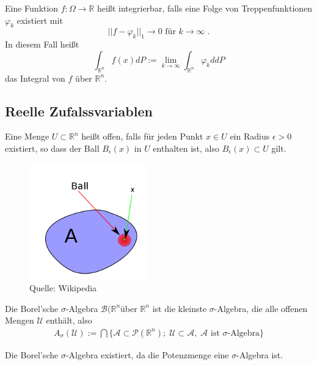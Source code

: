 \begin{Definition}
Eine Funktion $f : \Omega \to \mathbb{R}$ heißt integrierbar, falls eine Folge von Treppenfunktionen  $\varphi_k$ existiert mit
$$ || f -  \varphi_k ||_1 \to 0 \text{ für } k \to \infty \;. $$
In diesem Fall heißt
$$ \int_{\mathbb{R}^n} f(x) dP := \lim_{k \to \infty}  \int_{\mathbb{R}^n}  \varphi_k d dP$$
das Integral von $f$ über $\mathbb{R}^n$.
\end{Definition}


\subsection{Reelle Zufalssvariablen}

\begin{Definition}
Eine Menge $U \subset  \mathbb{R}^n$ heißt offen, falls für jeden Punkt $x \in U$ ein Radius $\epsilon > 0$ existiert, so dass der Ball $B_\epsilon (x)$ in $U$ enthalten ist, also 
$B_\epsilon (x) \subset U$ gilt.
\end{Definition}

\begin{figure}[htp]
      \centering
    \includegraphics[width=0.45\textwidth]{images/openset}
      \caption{Quelle: Wikipedia}
\end{figure}


\begin{Definition}
Die Borel'sche   $\sigma$-Algebra $\mathcal{B}(\mathbb{R}^n$über $\mathbb{R}^n$ ist die kleinste  $\sigma$-Algebra, die alle offenen Mengen $\mathcal{U}$ enthält, also 
\begin{align*}
A_\sigma (\mathcal{U}) := \bigcap \{  \mathcal{A} \subset \mathcal{P}(\mathbb{R}^n);  \;   \mathcal{U}  \subset  \mathcal{A},  \;  \mathcal{A} \text{ ist $\sigma$-Algebra} \}
\end{align*}
\end{Definition}

\begin{Satz}
Die Borel'sche   $\sigma$-Algebra existiert, da die Potenzmenge eine   $\sigma$-Algebra ist.
\end{Satz}

